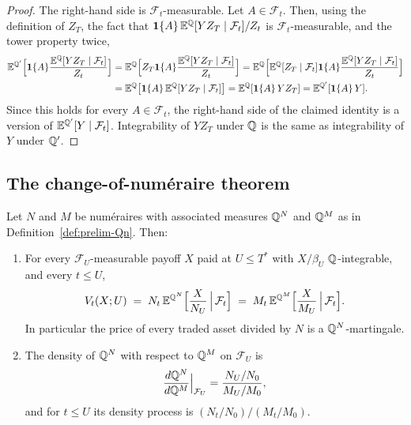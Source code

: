 \documentclass[../../../main.tex]{subfiles}
\begin{document}
\begin{proof}
The right-hand side is $\mathcal F_t$-measurable. Let $A\in\mathcal F_t$. Then, using the definition of $Z_T$, the fact that $\mathbf{1}\{A\}\,\mathbb{E}^{\mathbb{Q}}[YZ_T\mid\mathcal F_t]/Z_t$ is $\mathcal F_t$-measurable, and the tower property twice,
\begin{align*}
\mathbb{E}^{\mathbb{Q}'}\Big[\mathbf{1}\{A\}\frac{\mathbb{E}^{\mathbb{Q}}[YZ_T\mid\mathcal F_t]}{Z_t}\Big]
&=\mathbb{E}^{\mathbb{Q}}\Big[Z_T\mathbf{1}\{A\}\frac{\mathbb{E}^{\mathbb{Q}}[YZ_T\mid\mathcal F_t]}{Z_t}\Big]
=\mathbb{E}^{\mathbb{Q}}\Big[\mathbb{E}^{\mathbb{Q}}[Z_T\mid\mathcal F_t]\mathbf{1}\{A\}\frac{\mathbb{E}^{\mathbb{Q}}[YZ_T\mid\mathcal F_t]}{Z_t}\Big]\\
&=\mathbb{E}^{\mathbb{Q}}\big[\mathbf{1}\{A\}\,\mathbb{E}^{\mathbb{Q}}[YZ_T\mid\mathcal F_t]\big]
=\mathbb{E}^{\mathbb{Q}}[\mathbf{1}\{A\}\,YZ_T]
=\mathbb{E}^{\mathbb{Q}'}[\mathbf{1}\{A\}\,Y].
\end{align*}
Since this holds for every $A\in\mathcal F_t$, the right-hand side of the claimed identity is a version of $\mathbb{E}^{\mathbb{Q}'}[Y\mid\mathcal F_t]$. Integrability of $YZ_T$ under $\mathbb{Q}$ is the same as integrability of $Y$ under $\mathbb{Q}'$.
\end{proof}

\subsection{The change-of-num\'eraire theorem}

\begin{theorem}\label{thm:prelim-numeraire}
Let $N$ and $M$ be num\'eraires with associated measures $\mathbb{Q}^{N}$ and $\mathbb{Q}^{M}$ as in Definition~\ref{def:prelim-Qn}. Then:
\begin{enumerate}[nosep,label=(\roman*)]
\item For every $\mathcal F_U$-measurable payoff $X$ paid at $U\le T^*$ with $X/\beta_U$ $\mathbb{Q}$-integrable, and every $t\le U$,
\begin{equation}\label{eq:prelim-con}
V_t(X;U)\;=\;N_t\,\mathbb{E}^{\mathbb{Q}^{N}}\Big[\frac{X}{N_U}\,\Big|\,\mathcal F_t\Big]\;=\;M_t\,\mathbb{E}^{\mathbb{Q}^{M}}\Big[\frac{X}{M_U}\,\Big|\,\mathcal F_t\Big].
\end{equation}
In particular the price of every traded asset divided by $N$ is a $\mathbb{Q}^{N}$-martingale.
\item The density of $\mathbb{Q}^{N}$ with respect to $\mathbb{Q}^{M}$ on $\mathcal F_U$ is
\begin{equation}\label{eq:prelim-dQNdQM}
\frac{d\mathbb{Q}^{N}}{d\mathbb{Q}^{M}}\Big|_{\mathcal F_U}=\frac{N_U/N_0}{M_U/M_0},
\end{equation}
and for $t\le U$ its density process is $(N_t/N_0)/(M_t/M_0)$.
\end{enumerate}
\end{theorem}
\end{document}
